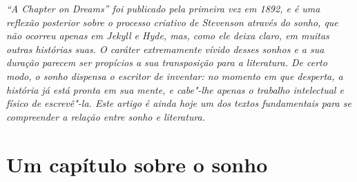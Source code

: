 \thispagestyle{empty}
\mbox{}\vfill
{\noindent\itshape “A Chapter on Dreams” foi publicado pela primeira vez em 1892, 
e é uma reflexão posterior sobre o processo criativo de Stevenson através 
do sonho, que não ocorreu apenas em \emph{Jekyll e Hyde}, mas, como ele deixa 
claro, em muitas outras histórias suas.  O caráter extremamente vívido desses 
sonhos e a sua duração parecem ser propícios a sua transposição para a literatura.  
De certo modo, o sonho dispensa o escritor de inventar: no momento em que desperta, 
a história já está pronta em sua mente, e cabe"-lhe apenas o trabalho intelectual e físico de escrevê"-la.   
Este artigo é ainda hoje um dos textos fundamentais para se compreender a 
relação entre sonho e literatura.}

\chapter[Um capítulo sobre o sonho\\ \textit{R.L.~Stevenson}]{Um capítulo sobre o sonho}

